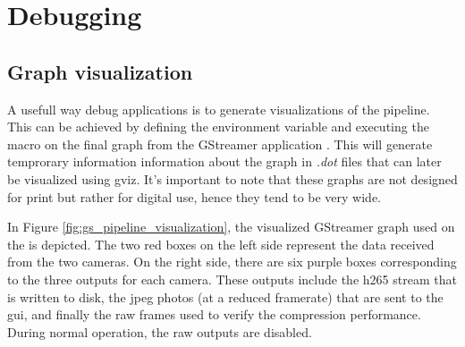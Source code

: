\section{Debugging}

\subsection{Graph visualization}
A usefull way debug \gs applications is to generate visualizations of the pipeline.
This can be achieved by defining the environment variable  and executing the  macro on the final graph from the GStreamer application
\cite{johnstonGeneratingGStreamerPipeline2018}.
This will generate temprorary information information about the graph in \textit{.dot} files that can later be visualized using \gls{gviz}.
It's important to note that these graphs are not designed for print but rather for digital use, hence they tend to be very wide.

In Figure \ref{fig:gs_pipeline_visualization}, the visualized GStreamer graph used on the \sr is depicted.
The two red boxes on the left side represent the data received from the two cameras.
On the right side, there are six purple boxes corresponding to the three outputs for each camera.
These outputs include the \gls{h265} stream that is written to disk, the \gls{jpeg} photos (at a reduced framerate) that are sent to the \gls{gui}, and finally the raw frames used to verify the compression performance.
During normal operation, the raw outputs are disabled.

